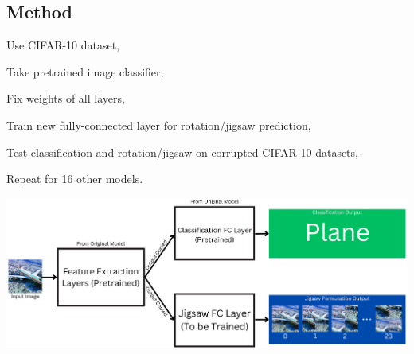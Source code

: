 \documentclass[a4paper]{article}
\begin{document}
{\begin{multicols}{2}
        \section{Method}
        \vspace{-0.3cm}
        \begin{compactitem}
            \item[1.] Use CIFAR-10 dataset,
            \item[2.] Take pretrained image classifier,
            \item[3.] Fix weights of all layers,
            \item[4.] Train new fully-connected layer for rotation/jigsaw prediction,
            \item[5.] Test classification and rotation/jigsaw on corrupted CIFAR-10 datasets,
            \item[6.] Repeat for 16 other models.
        \end{compactitem}
        \vspace{0.3cm}
        \includegraphics[scale=0.145]{images/diagram.png}
        
    \columnbreak


\end{multicols}}
\end{document}
